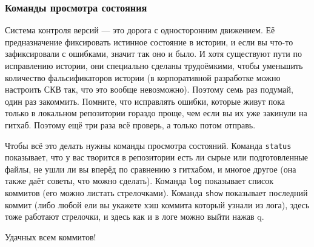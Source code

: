 \documentclass[12pt]{article}
\begin{document}
\subsubsection{Команды просмотра состояния}
Система контроля версий --- это дорога с односторонним движением. Её предназначение фиксировать истинное состояние в истории, и если вы что-то зафиксировали с ошибками, значит так оно и было. И хотя существуют пути по исправлению истории, они специально сделаны трудоёмкими, чтобы уменьшить количество фальсификаторов истории (в корпоративной разработке можно настроить СКВ так, что это вообще невозможно). Поэтому семь раз подумай, один раз закоммить. Помните, что исправлять ошибки, которые живут пока только в локальном репозитории гораздо проще, чем если вы их уже закинули на гитхаб. Поэтому ещё три раза всё проверь, а только потом отправь.

\begin{center}
\large{}
\end{center}

\begin{center}
\large{}
\end{center}

\begin{center}
\large{}
\end{center}

Чтобы всё это делать нужны команды просмотра состояний. Команда \verb|status| показывает, что у вас творится в репозитории есть ли сырые или подготовленные файлы, не ушли ли вы вперёд по сравнению з гитхабом, и многое другое (она также даёт советы, что можно сделать). Команда \verb|log| показывает список коммитов (его можно листать стрелочками). Команда \verb|show| показывает последний коммит (либо любой ели вы укажете хэш коммита который узнали из лога), здесь тоже работают стрелочки, и здесь как и в логе можно выйти нажав q.

\begin{center}
Удачных всем коммитов!
\end{center}
\end{document}
